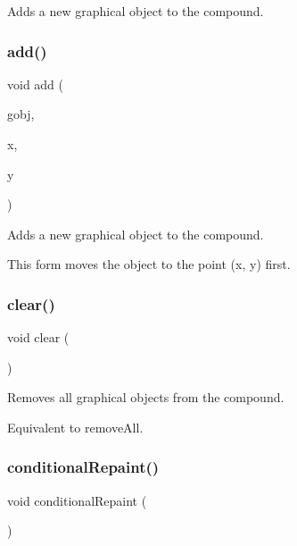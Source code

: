 Adds a new graphical object to the compound. 

\mbox{\label{classGCompound_a5b11b532869632a6c26b098b0858eac5}} 
\subsubsection{\texorpdfstring{add()}{add()}\hspace{0.1cm}{\footnotesize\ttfamily [4/4]}}
{\footnotesize\ttfamily void add (\begin{DoxyParamCaption}\item[{\mbox{\hyperlink{classGObject}{G\+Object}} \&}]{gobj,  }\item[{double}]{x,  }\item[{double}]{y }\end{DoxyParamCaption})\hspace{0.3cm}{\ttfamily [virtual]}}



Adds a new graphical object to the compound. 

This form moves the object to the point ({\ttfamily x}, {\ttfamily y}) first. \mbox{\label{classGCompound_ac8bb3912a3ce86b15842e79d0b421204}} 
\subsubsection{\texorpdfstring{clear()}{clear()}}
{\footnotesize\ttfamily void clear (\begin{DoxyParamCaption}{ }\end{DoxyParamCaption})\hspace{0.3cm}{\ttfamily [virtual]}}



Removes all graphical objects from the compound. 

Equivalent to remove\+All. \mbox{\label{classGCompound_a221b3e75bb3d9d0bfea62b3364e6773b}} 
\subsubsection{\texorpdfstring{conditional\+Repaint()}{conditionalRepaint()}}
{\footnotesize\ttfamily void conditional\+Repaint (\begin{DoxyParamCaption}{ }\end{DoxyParamCaption})\hspace{0.3cm}{\ttfamily [virtual]}}



